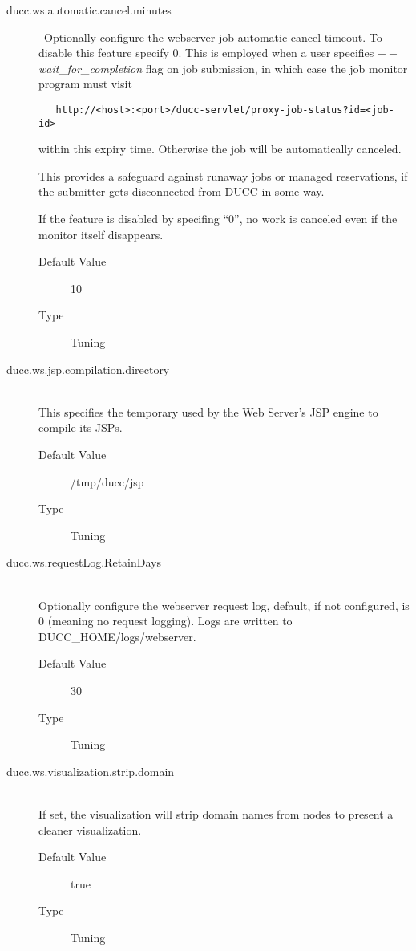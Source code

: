 \begin{description}
        \item[ducc.ws.automatic.cancel.minutes] \hfill \ Optionally configure the webserver job
          automatic cancel timeout. To disable this feature specify 0.  This is employed when a user
          specifies {\em$--$wait\_for\_completion} flag on job submission, in which case the job
          monitor program must visit 
\begin{verbatim}
   http://<host>:<port>/ducc-servlet/proxy-job-status?id=<job-id>
\end{verbatim}
          within this expiry time.  Otherwise the job will be automatically canceled.

          This provides a safeguard against runaway jobs or managed reservations, if the
          submitter gets disconnected from DUCC in some way.

          If the feature is disabled by specifing ``0'', no work is canceled even if the
          monitor itself disappears.

          \begin{description}
            \item[Default Value] 10
            \item[Type] Tuning
          \end{description}

        \item[ducc.ws.jsp.compilation.directory] \hfill \\
          This specifies the temporary used by the Web Server's JSP engine to compile its JSPs.
          \begin{description}
            \item[Default Value] /tmp/ducc/jsp
            \item[Type] Tuning
          \end{description}

        \item[ducc.ws.requestLog.RetainDays] \hfill \\
          Optionally configure the webserver request log, default, if not configured, is 0 (meaning no request logging).
          Logs are written to DUCC\_HOME/logs/webserver.
          \begin{description}
            \item[Default Value] 30
            \item[Type] Tuning
          \end{description}

        \item[ducc.ws.visualization.strip.domain] \hfill \\
          If set, the visualization will strip domain names from nodes to present a cleaner visualization.
          \begin{description}
            \item[Default Value] true
            \item[Type] Tuning
          \end{description}

      \end{description}  
            
